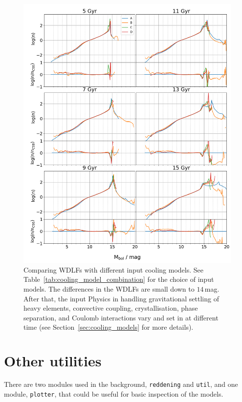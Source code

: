 \documentclass[fleqn,usenatbib]{rasti}
\begin{document}
\begin{figure}
    \centering
    \includegraphics[width=\textwidth]{wdlf_compare_da_cooling_models.png}
    \caption{Comparing WDLFs with different input cooling models. See
    Table~\ref{tab:cooling_model_combination} for the choice of input models.
    The differences in the WDLFs are small down to $14$\,mag. After that, the
    input Physics in handling gravitational settling of heavy elements,
    convective coupling, crystallisation, phase separation, and Coulomb
    interactions vary and set in at different time (see
    Section~\ref{sec:cooling_models} for more details).
    }
    \label{fig:wdlf_compare_da_cooling_models}
\end{figure}


\section{Other utilities}
There are two modules used in the background, \texttt{reddening} and
\texttt{util}, and one module, \texttt{plotter}, that could be useful for
basic inspection of the models.
\end{document}
